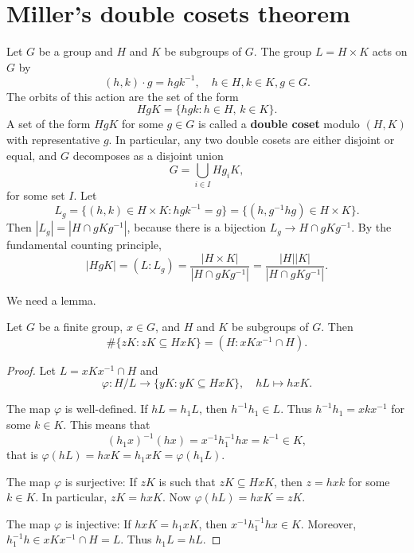 



\section{Miller's double cosets theorem}

Let $G$ be a group and $H$ and $K$ be subgroups of $G$. 
The group $L=H\times K$ acts on $G$ by
\[
(h,k)\cdot g=hgk^{-1},\quad h\in H,k\in K,g\in G.
\]
The orbits of this action are the set of the form 
\[
HgK=\{hgk:h\in H,\,k\in K\}.
\]
A set of the form $HgK$ for some $g\in G$ is called a \textbf{double coset} modulo $(H,K)$ 
with representative $g$. In particular, 
any two double cosets are either disjoint or equal, and $G$ decomposes
as a disjoint union 
\[
G=\bigcup_{i\in I}Hg_iK,
\]
for some set $I$. Let 
\[
L_g=\{(h,k)\in H\times K:hgk^{-1}=g\}=\{(h,g^{-1}hg)\in H\times K\}.
\]
Then
$|L_g|=|H\cap gKg^{-1}|$, 
because there is a bijection $L_g\to H\cap gKg^{-1}$.  
By the fundamental counting principle, 
\[
|HgK|=(L:L_g)=\frac{|H\times K|}{|H\cap gKg^{-1}|}=\frac{|H||K|}{|H\cap gKg^{-1}|}.
\]

We need a lemma. 

\begin{lemma}
\label{lem:Miller}
    Let $G$ be a finite group, $x\in G$, and $H$ and $K$ be subgroups of $G$. Then
    \[
    \#\{zK:zK\subseteq HxK\}=(H:xKx^{-1}\cap H).
    \]
\end{lemma}

\begin{proof}
    Let $L=xKx^{-1}\cap H$ and 
    \[
    \varphi\colon H/L\to\{yK:yK\subseteq HxK\},\quad 
    hL\mapsto hxK.
    \]

    The map $\varphi$ is well-defined. If $hL=h_1L$, then $h^{-1}h_1\in L$. Thus 
    $h^{-1}h_1=xkx^{-1}$ for some $k\in K$. This means that
    \[
    (h_1x)^{-1}(hx)=x^{-1}h_1^{-1}hx=k^{-1}\in K,
    \]
    that is $\varphi(hL)=hxK=h_1xK=\varphi(h_1L)$. 

    The map $\varphi$ is surjective: If $zK$ is such that $zK\subseteq HxK$, then 
    $z=hxk$ for some $k\in K$. In particular, 
    $zK=hxK$. Now $\varphi(hL)=hxK=zK$.

    The map $\varphi$ is injective: If $hxK=h_1xK$, then 
    $x^{-1}h_1^{-1}hx\in K$. Moreover, 
    $h_1^{-1}h\in xKx^{-1}\cap H=L$. Thus $h_1L=hL$. 
\end{proof}

